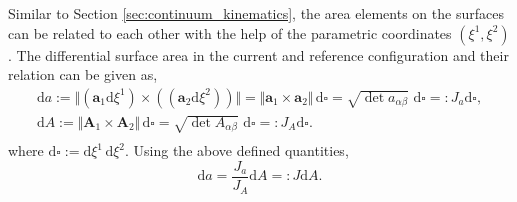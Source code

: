 Similar to Section \ref{sec:continuum_kinematics}, the area elements on the surfaces can be related to each other
 with the help of the parametric coordinates $(\xi^{1}, \xi^{2})$. The differential surface area in the current and reference configuration and their relation can be given as,
 \begin{gather} \label{area_something_man}
    \mathrm{d}a := \Vert (\boldsymbol{a}_{1} \mathrm{d}\xi^{1}) \times ((\boldsymbol{a}_{2} \mathrm{d}\xi^{2})) \Vert = \Vert \boldsymbol{a}_{1} \times \boldsymbol{a}_{2} \Vert\, \mathrm{d}\square = \sqrt{\det a_{\alpha \beta}}\,\, \mathrm{d}\square =: J_{a} \mathrm{d}\square,\\
    \mathrm{d}A := \Vert \boldsymbol{A}_{1} \times \boldsymbol{A}_{2} \Vert \, \mathrm{d}\square = \sqrt{\det A_{\alpha \beta}}\,\, \mathrm{d}\square =: J_{A} \mathrm{d}\square.\\    
\end{gather}
where $\mathrm{d} \square := \mathrm{d} \xi^{1} \, \mathrm{d} \xi^{2}$. Using the above defined quantities, 
\begin{equation} \label{area_something_final}
    \mathrm{d}a = \frac{J_{a}}{J_{A}} \mathrm{d}A =: J \mathrm{d}A.
\end{equation} 
 

